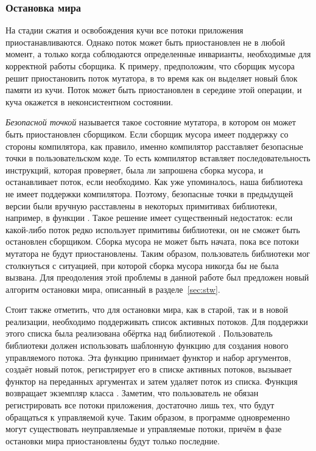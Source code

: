 \subsubsection{Остановка мира}
На стадии сжатия и освобождения кучи все потоки приложения приостанавливаются. 
Однако поток может быть приостановлен не в любой момент, а только когда соблюдаются 
определенные инварианты, необходимые для корректной работы сборщика. 
К примеру, предположим, что сборщик мусора решит приостановить поток мутатора, в то время 
как он выделяет новый блок памяти из кучи. 
Поток может быть приостановлен в середине этой операции, и куча окажется в неконсистентном 
состоянии.
    
\emph{Безопасной точкой} называется такое состояние мутатора, в котором он может быть 
приостановлен сборщиком. 
Если сборщик мусора имеет поддержку со стороны компилятора, как правило, именно компилятор 
расставляет безопасные точки в пользовательском коде. 
То есть компилятор вставляет последовательность инструкций, которая проверяет, была ли 
запрошена сборка мусора, и останавливает поток, если необходимо. 
Как уже упоминалось, наша библиотека не имеет поддержки компилятора. 
Поэтому, безопасные точки в предыдущей версии были вручную расставлены в некоторых 
примитивах библиотеки, например, в функции . 
Такое решение имеет существенный недостаток: если какой-либо поток редко использует 
примитивы библиотеки, он не сможет быть остановлен сборщиком. 
Сборка мусора не может быть начата, пока все потоки мутатора не будут приостановлены. 
Таким образом, пользователь библиотеки мог столкнуться с ситуацией, при которой сборка 
мусора никогда бы не была вызвана. 
Для преодоления этой проблемы в данной работе был предложен новый алгоритм остановки мира, 
описанный в разделе~\ref{sec:stw}.

Стоит также отметить, что для остановки мира, как в старой, так и в новой реализации, 
необходимо поддерживать список активных потоков. 
Для поддержки этого списка была реализована обёртка над библиотекой . 
Пользователь библиотеки должен использовать шаблонную функцию  
для создания нового управляемого потока. 
Эта функцию принимает функтор и набор аргументов, создаёт новый поток, регистрирует его в 
списке активных потоков, вызывает функтор на переданных аргументах и затем удаляет поток из 
списка. 
Функция  возвращает экземпляр класса . 
Заметим, что пользователь не обязан регистрировать все потоки приложения, достаточно лишь тех, 
что будут обращаться к управляемой куче. 
Таким образом, в программе одновременно могут существовать неуправляемые и управляемые потоки, 
причём в фазе остановки мира приостановлены будут только последние. 

